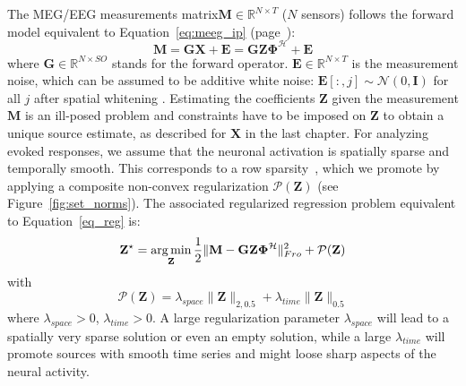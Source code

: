 The MEG/EEG measurements matrix$\mathbf{M} \in \mathbb{R}^{N \times T}$ ($N$ sensors) follows the forward model equivalent to Equation~\eqref{eq:meeg_ip} (page~\pageref{eq:meeg_ip}):
\begin{equation} \label{eq:reg_prob_tf}
    \mathbf{M} = \mathbf{GX} + \mathbf{E} = \mathbf{GZ \Phi}^{\mathcal{H}} + \mathbf{E}
\end{equation}
where $\mathbf{G} \in \mathbb{R}^{N \times SO}$ stands for the forward operator. $\mathbf{E} \in \mathbb{R}^{N \times T}$ is the measurement noise, which can be assumed to be additive white noise: $\mathbf{E}[:, j] \sim \mathcal{N}(0, \mathbf{I})$ for all $j$ after spatial whitening \cite{denis}. Estimating the coefficients $\mathbf{Z}$ given the measurement $\mathbf{M}$ is an ill-posed problem and constraints have to be imposed on $\mathbf{Z}$ to obtain a unique source estimate, as described for $\mathbf{X}$ in the last chapter. For analyzing evoked responses, we assume that the neuronal activation is spatially sparse and temporally smooth. This corresponds to a row sparsity~\cite{TF-MxNE}, which we promote by applying a composite non-convex regularization $\mathcal{P}(\mathbf{Z})$ (see Figure~\ref{fig:set_norms}). The associated regularized regression problem equivalent to Equation~\eqref{eq_reg} is:
\begin{equation} \label{eq:penalized_reg_tf}
    \mathbf{Z}^\star = \mathop{\mathrm{arg}\,\mathrm{min}}_{\mathbf{Z}} \frac{1}{2}\|\mathbf{M - GZ\Phi^\mathcal{H}}\|^2_{Fro} + \mathcal{P}(\mathbf{Z})
\end{equation}
with
\begin{equation}
	\mathcal{P}(\mathbf{Z}) = \lambda_{space}\|\mathbf{Z}\|_{2,0.5} + \lambda_{time}\|\mathbf{Z}\|_{0.5}
\end{equation}
where $\lambda_{space} > 0$, $\lambda_{time}>0$. A large regularization parameter $\lambda_{space}$ will lead to a spatially very sparse solution or even an empty solution, while a large $\lambda_{time}$ will promote sources with smooth time series and might loose sharp aspects of the neural activity.

